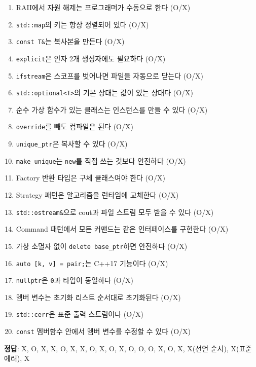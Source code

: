 \documentclass[11pt,a4paper]{article}
\newcommand{\code}[1]{\texttt{#1}}
\begin{document}
\begin{quizbox}[title={최종 점검}]
\begin{enumerate}[nosep]
\item RAII에서 자원 해제는 프로그래머가 수동으로 한다 (O/X)
\item \code{std::map}의 키는 항상 정렬되어 있다 (O/X)
\item \code{const T\&}는 복사본을 만든다 (O/X)
\item \code{explicit}은 인자 2개 생성자에도 필요하다 (O/X)
\item \code{ifstream}은 스코프를 벗어나면 파일을 자동으로 닫는다 (O/X)
\item \code{std::optional<T>}의 기본 상태는 값이 있는 상태다 (O/X)
\item 순수 가상 함수가 있는 클래스는 인스턴스를 만들 수 있다 (O/X)
\item \code{override}를 빼도 컴파일은 된다 (O/X)
\item \code{unique\_ptr}은 복사할 수 있다 (O/X)
\item \code{make\_unique}는 \code{new}를 직접 쓰는 것보다 안전하다 (O/X)
\item Factory 반환 타입은 구체 클래스여야 한다 (O/X)
\item Strategy 패턴은 알고리즘을 런타임에 교체한다 (O/X)
\item \code{std::ostream\&}으로 cout과 파일 스트림 모두 받을 수 있다 (O/X)
\item Command 패턴에서 모든 커맨드는 같은 인터페이스를 구현한다 (O/X)
\item 가상 소멸자 없이 \code{delete base\_ptr}하면 안전하다 (O/X)
\item \code{auto [k, v] = pair;}는 C++17 기능이다 (O/X)
\item \code{nullptr}은 \code{0}과 타입이 동일하다 (O/X)
\item 멤버 변수는 초기화 리스트 순서대로 초기화된다 (O/X)
\item \code{std::cerr}은 표준 출력 스트림이다 (O/X)
\item \code{const} 멤버함수 안에서 멤버 변수를 수정할 수 있다 (O/X)
\end{enumerate}

\textbf{정답}: X, O, X, X, O, X, X, O, X, O, X, O, O, O, X, O, X, X(선언 순서), X(표준 에러), X
\end{quizbox}
\end{document}
